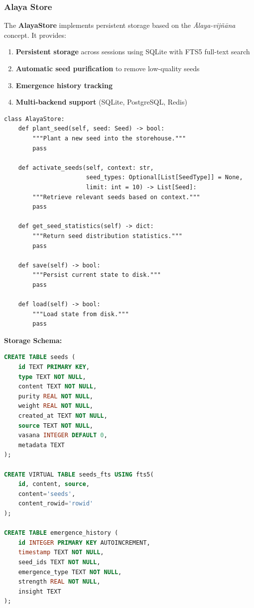 \documentclass[11pt, a4paper]{article}
\begin{document}
\subsubsection{Alaya Store}

The \textbf{AlayaStore} implements persistent storage based on the \textit{Ālaya-vijñāna} concept. It provides:

\begin{enumerate}
    \item \textbf{Persistent storage} across sessions using SQLite with FTS5 full-text search
    \item \textbf{Automatic seed purification} to remove low-quality seeds
    \item \textbf{Emergence history tracking}
    \item \textbf{Multi-backend support} (SQLite, PostgreSQL, Redis)
\end{enumerate}

\begin{lstlisting}[style=python, caption={AlayaStore Class}, label={lst:alaya-store}]
class AlayaStore:
    def plant_seed(self, seed: Seed) -> bool:
        """Plant a new seed into the storehouse."""
        pass
    
    def activate_seeds(self, context: str, 
                       seed_types: Optional[List[SeedType]] = None,
                       limit: int = 10) -> List[Seed]:
        """Retrieve relevant seeds based on context."""
        pass
    
    def get_seed_statistics(self) -> dict:
        """Return seed distribution statistics."""
        pass
    
    def save(self) -> bool:
        """Persist current state to disk."""
        pass
    
    def load(self) -> bool:
        """Load state from disk."""
        pass
\end{lstlisting}

\textbf{Storage Schema:}

\begin{lstlisting}[language=SQL, caption={Database Schema}, label={lst:schema}]
CREATE TABLE seeds (
    id TEXT PRIMARY KEY,
    type TEXT NOT NULL,
    content TEXT NOT NULL,
    purity REAL NOT NULL,
    weight REAL NOT NULL,
    created_at TEXT NOT NULL,
    source TEXT NOT NULL,
    vasana INTEGER DEFAULT 0,
    metadata TEXT
);

CREATE VIRTUAL TABLE seeds_fts USING fts5(
    id, content, source,
    content='seeds',
    content_rowid='rowid'
);

CREATE TABLE emergence_history (
    id INTEGER PRIMARY KEY AUTOINCREMENT,
    timestamp TEXT NOT NULL,
    seed_ids TEXT NOT NULL,
    emergence_type TEXT NOT NULL,
    strength REAL NOT NULL,
    insight TEXT
);
\end{lstlisting}
\end{document}
